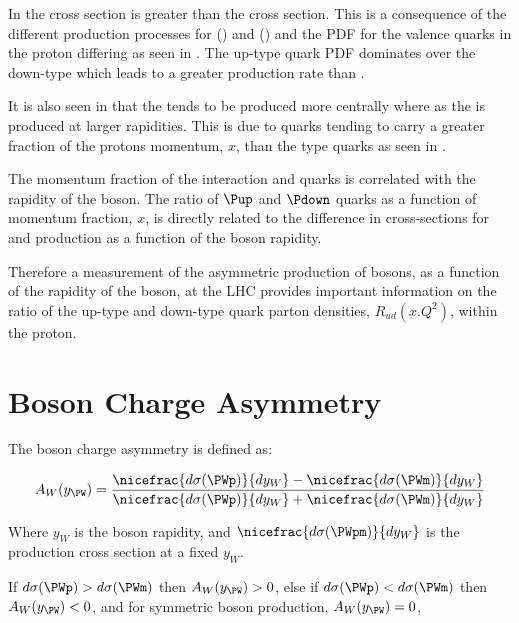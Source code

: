 In  the \PWp cross section is greater than the \PWm
cross section. This is a consequence of the different production processes for
\PWp () and \PWm () and the
\ac{PDF} for the valence quarks in the proton differing as seen in
. The up-type quark \ac{PDF} dominates over the
down-type which leads to a greater \PWp production rate than \PWm.

It is also seen in  that the \PWm tends to be produced
more centrally where as the \PWp is produced at larger rapidities. This is due
to \Pup quarks tending to carry a greater fraction of the protons momentum,
$x$, than the \Pdown type quarks as seen in .

The momentum fraction of the interaction \Pup and \Pdown quarks is correlated
with the rapidity of the \PW boson. The ratio of $\Pup$ and $\Pdown$ quarks as
a function of momentum fraction, $x$, is directly related to the difference in
cross-sections for \PWp and \PWm production as a function of the boson
rapidity.

Therefore a measurement of the asymmetric production of \PW bosons, as a
function of the rapidity of the boson, at the \ac{LHC} provides important
information on the ratio of the up-type and down-type quark parton densities,
$R_{ud}(x.Q^2)$, within the proton. 

\section{\PW Boson Charge Asymmetry}

The \PWpm boson charge asymmetry is defined as:

\begin{equation}
  A_{W}(y_{\PW})=
    \frac{ 
      \nicefrac{ d\sigma (\PWp) }{ dy_{W} } -
      \nicefrac{ d\sigma (\PWm) }{ dy_{W} }
    }
    {
      \nicefrac{ d\sigma (\PWp) }{ dy_{W} } +
      \nicefrac{ d\sigma (\PWm) }{ dy_{W} }
    }
\label{wbos:wasym}
\end{equation} 

Where $y_{W}$ is the boson rapidity, and 
$\nicefrac{ d\sigma (\PWpm) }{ dy_{W} }$ is the \PWpm production cross section
at a fixed $y_{W}$. 

If $d\sigma(\PWp) > d\sigma(\PWm) $ then $A_{W}(y_{\PW})> 0$,
else if $d\sigma(\PWp) < d\sigma(\PWm) $ then $A_{W}(y_{\PW})< 0$,
and for symmetric \PWpm boson production, $A_{W}(y_{\PW})= 0$,

